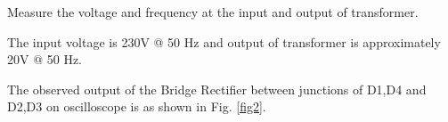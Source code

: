 \documentclass[journal,12pt,twocolumn]{IEEEtran}
\begin{document}

\begin{problem}
Measure the voltage and frequency at the input and output of transformer.
\end{problem}

\solution
The input voltage is 230V @ 50 Hz and output of transformer is approximately 20V @ 50 Hz.



\begin{problem}
The observed output of the Bridge Rectifier between junctions of D1,D4 and D2,D3 on  oscilloscope is as shown in Fig. \ref{fig2}.
\end{problem}


\end{document}
